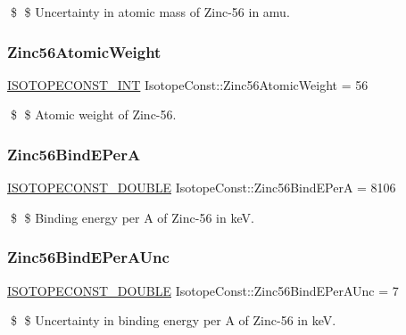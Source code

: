 \$ \$ Uncertainty in atomic mass of Zinc-\/56 in amu. \mbox{\label{group___isotope_const-_zinc-_zn56_ga5f1e529f2f323c68df9775b316fa665d}} 
\subsubsection{\texorpdfstring{Zinc56\+Atomic\+Weight}{Zinc56AtomicWeight}}
{\footnotesize\ttfamily \mbox{\hyperlink{group___isotope_const-_macros_ga5f18360b3e99483a35c32d789e62621c}{I\+S\+O\+T\+O\+P\+E\+C\+O\+N\+S\+T\+\_\+\+I\+NT}} Isotope\+Const\+::\+Zinc56\+Atomic\+Weight = 56}

\$ \$ Atomic weight of Zinc-\/56. \mbox{\label{group___isotope_const-_zinc-_zn56_gab3461f9e71cb4dc98e1e120f53c3626f}} 
\subsubsection{\texorpdfstring{Zinc56\+Bind\+E\+PerA}{Zinc56BindEPerA}}
{\footnotesize\ttfamily \mbox{\hyperlink{group___isotope_const-_macros_ga8f45a7272ce02c0b4c65c44636ed719a}{I\+S\+O\+T\+O\+P\+E\+C\+O\+N\+S\+T\+\_\+\+D\+O\+U\+B\+LE}} Isotope\+Const\+::\+Zinc56\+Bind\+E\+PerA = 8106}

\$ \$ Binding energy per A of Zinc-\/56 in keV. \mbox{\label{group___isotope_const-_zinc-_zn56_gabd9cfdfc93c6ac318b380eed662d5f74}} 
\subsubsection{\texorpdfstring{Zinc56\+Bind\+E\+Per\+A\+Unc}{Zinc56BindEPerAUnc}}
{\footnotesize\ttfamily \mbox{\hyperlink{group___isotope_const-_macros_ga8f45a7272ce02c0b4c65c44636ed719a}{I\+S\+O\+T\+O\+P\+E\+C\+O\+N\+S\+T\+\_\+\+D\+O\+U\+B\+LE}} Isotope\+Const\+::\+Zinc56\+Bind\+E\+Per\+A\+Unc = 7}

\$ \$ Uncertainty in binding energy per A of Zinc-\/56 in keV. \mbox{\label{group___isotope_const-_zinc-_zn56_gac26998542889d68b567612a8b8f03867}} 
